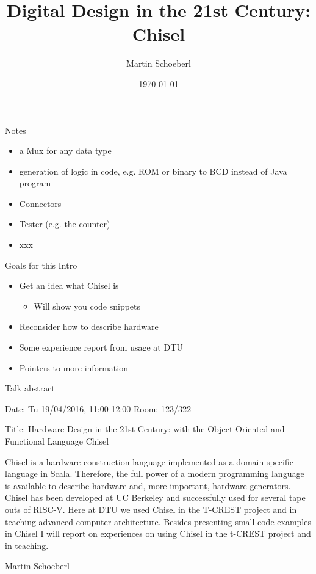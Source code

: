 \documentclass[xcolor=pdflatex,dvipsnames,table]{beamer}
\title{Digital Design in the 21st Century: Chisel}
\author{Martin Schoeberl}
\date{\today}
\institute{DTU Compute}
\begin{document}
\begin{frame}
\titlepage
\end{frame}

\begin{frame}[fragile]{Notes}
\begin{itemize}
\item a Mux for any data type
\item generation of logic in code, e.g. ROM or binary to BCD instead of Java program
\item Connectors
\item Tester (e.g. the counter)
\item xxx
\end{itemize}
\end{frame}


\begin{frame}[fragile]{Goals for this Intro}
\begin{itemize}
\item Get an idea what Chisel is
\begin{itemize}
\item Will show you code snippets
\end{itemize}
\item Reconsider how to describe hardware
\item Some experience report from usage at DTU
\item Pointers to more information
\end{itemize}
\end{frame}

\begin{frame}[fragile]{Talk abstract}

Date: Tu 19/04/2016, 11:00-12:00
Room: 123/322

Title: Hardware Design in the 21st Century: with the Object Oriented
and Functional Language Chisel

Chisel is a hardware construction language implemented as a
domain specific language in Scala. Therefore, the full power of
a modern programming language is available to describe hardware
and, more important, hardware generators. Chisel has been developed
at UC Berkeley and successfully used for several tape outs of RISC-V.
Here at DTU we used Chisel in the T-CREST project and in teaching
advanced computer architecture. Besides presenting small code
examples in Chisel I will report on experiences on using Chisel in
the t-CREST project and in teaching.

Martin Schoeberl
\end{frame}
\end{document}
